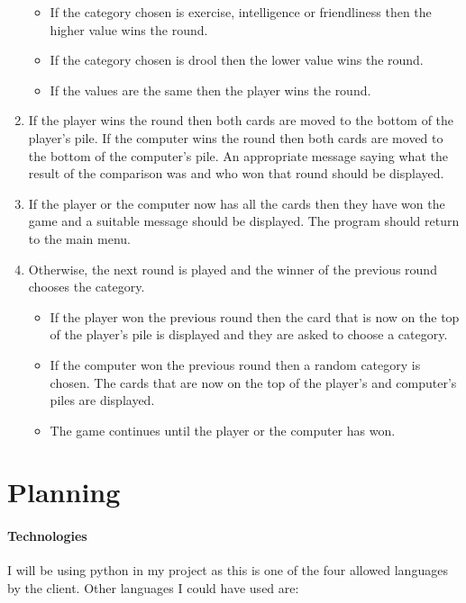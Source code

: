 \documentclass[a4paper]{article}
\begin{document}
\begin{enumerate}
\begin{itemize}
			\item If the category chosen is exercise, intelligence or friendliness then the higher value wins the round.
			\item If the category chosen is drool then the lower value wins the round.
			\item If the values are the same then the player wins the round.
		\end{itemize}
		\item If the player wins the round then both cards are moved to the bottom of the player’s pile. If the computer wins the round then both cards are moved to the bottom of the computer’s pile. An appropriate message saying what the result of the comparison was and who won that round should be displayed.
		\item If the player or the computer now has all the cards then they have won the game and a suitable message should be displayed. The program should return to the main menu.
		\item Otherwise, the next round is played and the winner of the previous round chooses the category.
		\begin{itemize}
			\item If the player won the previous round then the card that is now on the top of the player’s pile is displayed and they are asked to choose a category.
			\item If the computer won the previous round then a random category is chosen. The cards that are now on the top of the player’s and computer’s piles are displayed.
			\item The game continues until the player or the computer has won.
		\end{itemize}
	\end{enumerate}
	\pagebreak
	\section{Planning}
	\paragraph{Technologies}
	I will be using python in my project as this is one of the four allowed languages by the client. Other languages I could have used are: %
\end{document}
